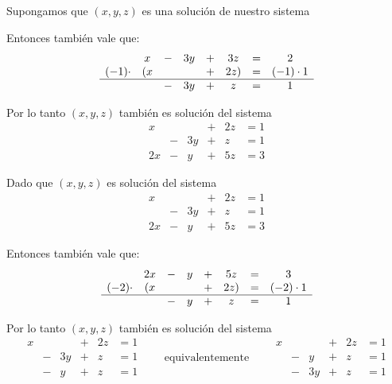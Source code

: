 \documentclass[handout]{beamer} %
\renewcommand{\_}[1]{_{\left( #1 \right)}}
\renewcommand{\^}[1]{^{\left( #1 \right)}}
\begin{document}
\begin{frame}

Supongamos que $(x,y,z)$ es una solución de nuestro sistema



Entonces también vale que: 
\begin{equation*}
\begin{matrix}
&x& -&3y & +&3z & = & 2 \\
(-1)\cdot&(x & & & +&2z) & = &(-1)\cdot1 \\
\hline
&& -&3y & +&z & = & 1  
\end{matrix}
\end{equation*}

 \pause
Por lo tanto $(x,y,z)$ también es solución del sistema
\begin{equation*}
\begin{matrix}
x & & & +&2z & = 1 \\
& -&3y & +&z & = 1   \\
2x& -&y & +&5z & =3
\end{matrix}
\end{equation*}
\end{frame}


\begin{frame}
Dado que $(x,y,z)$ es solución del sistema
\begin{equation*}
    \begin{matrix}
        x & & & +&2z & = 1 \\
        & -&3y & +&z & = 1   \\
        2x& -&y & +&5z & =3
    \end{matrix}
\end{equation*}


Entonces también vale que: 
\begin{equation*}
\begin{matrix}
&2x& -&y & +&5z & = &3 \\
(-2)\cdot&(x & & & +&2z) & = &(-2)\cdot1 \\
\hline
& & -&y & +& z & = & 1  
\end{matrix}
\end{equation*}
\pause
 
Por lo tanto $(x,y,z)$ también es solución del sistema
\begin{equation*}
\begin{matrix}
x & & & +&2z & = 1 \\
& -&3y & +&z & = 1   \\
& -&y & +&z & =1
\end{matrix}
\qquad\mbox{equivalentemente}\qquad
\begin{matrix}
x & & & +&2z & = 1 \\
& -&y & +&z & =1\\
& -&3y & +&z & = 1 
\end{matrix}
\end{equation*}
\end{frame}
\end{document}

